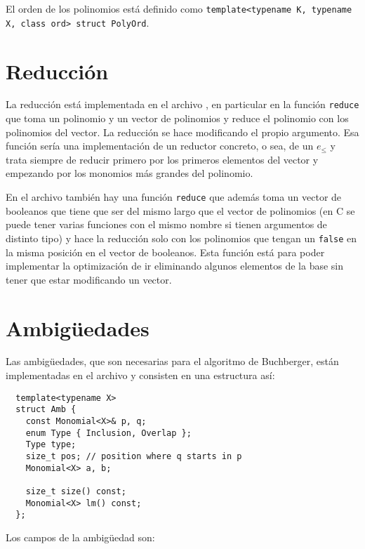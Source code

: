 \documentclass[12pt]{report}
\theoremstyle{customstyle}
\theoremstyle{factstyle}
\newcommand\cpp{C\nolinebreak[4]\hspace{-.05em}\raisebox{.4ex}{\relsize{-3}{\textbf{++}}}\xspace}
\begin{document}
El orden de los polinomios está definido como \texttt{template<typename K, typename X, class ord> struct PolyOrd}.

\section{Reducción}

La reducción está implementada en el archivo , en particular en la función \texttt{reduce} que toma un polinomio y un vector de polinomios y reduce el polinomio con los polinomios del vector. La reducción se hace modificando el propio argumento. Esa función sería una implementación de un reductor concreto, o sea, de un $e_≤$ y trata siempre de reducir primero por los primeros elementos del vector y empezando por los monomios más grandes del polinomio.

En el archivo también hay una función \texttt{reduce} que además toma un vector de booleanos que tiene que ser del mismo largo que el vector de polinomios (en \cpp se puede tener varias funciones con el mismo nombre si tienen argumentos de distinto tipo) y hace la reducción solo con los polinomios que tengan un \texttt{false} en la misma posición en el vector de booleanos. Esta función está para poder implementar la optimización de ir eliminando algunos elementos de la base sin tener que estar modificando un vector.

\section{Ambigüedades}

Las ambigüedades, que son necesarias para el algoritmo de Buchberger, están implementadas en el archivo  y consisten en una estructura así:

\begin{verbatim}
  template<typename X>
  struct Amb {
    const Monomial<X>& p, q;
    enum Type { Inclusion, Overlap };
    Type type;
    size_t pos; // position where q starts in p
    Monomial<X> a, b;

    size_t size() const;
    Monomial<X> lm() const;
  };
\end{verbatim}

Los campos de la ambigüedad son:
\end{document}
